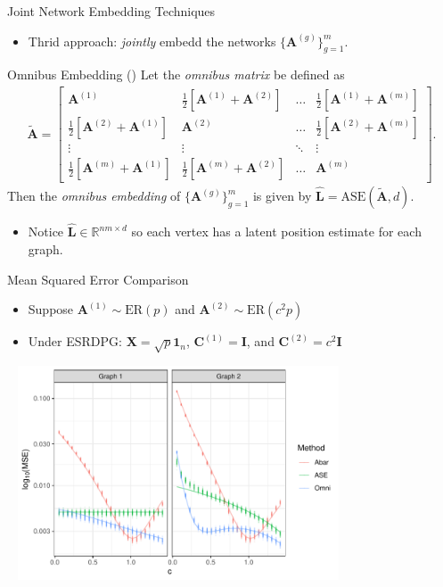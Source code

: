 \documentclass[handout]{beamer}
\newcommand{\bvar}[1]{\mathbf{#1}}
\begin{document}
\begin{frame}{Joint Network Embedding Techniques}
\begin{itemize}
        \item Thrid approach: \textit{jointly} embedd the networks $\{\bvar{A}^{(g)}\}_{g=1}^m$.
\end{itemize}
\begin{block}{Omnibus Embedding (\cite{OmniCLT})}
Let the \textit{omnibus matrix} be defined as
\begin{align*}
    \tilde{\bvar{A}} = \begin{bmatrix}
        \bvar{A}^{(1)} &\frac{1}{2}[\bvar{A}^{(1)} + \bvar{A}^{(2)}] & \dots & \frac{1}{2}[\bvar{A}^{(1)} + \bvar{A}^{(m)}]\\
        \frac{1}{2}[\bvar{A}^{(2)} + \bvar{A}^{(1)}] & \bvar{A}^{(2)} & \dots & \frac{1}{2}[\bvar{A}^{(2)} + \bvar{A}^{(m)}]\\
        \vdots & \vdots & \ddots & \vdots\\
        \frac{1}{2}[\bvar{A}^{(m)} + \bvar{A}^{(1)}] & \frac{1}{2}[\bvar{A}^{(m)} + \bvar{A}^{(2)}] & \dots & \bvar{A}^{(m)}
    \end{bmatrix}.
\end{align*}
Then the \textit{omnibus embedding} of $\{\bvar{A}^{(g)}\}_{g=1}^m$ is given by $\hat{\bvar{L}} = \text{ASE}(\tilde{\bvar{A}}, d)$. 
\end{block}
\begin{itemize}
        \item Notice $\hat{\bvar{L}}\in\mathbb{R}^{nm\times d}$ so each vertex has a latent position estimate for each graph.  
\end{itemize}
\end{frame}


\begin{frame}{Mean Squared Error Comparison}
    \begin{itemize}
        \item Suppose $\bvar{A}^{(1)}\sim\text{ER}(p)$ and $\bvar{A}^{(2)}\sim\text{ER}(c^2p)$
        \item Under ESRDPG: $\bvar{X} = \sqrt{p}\bvar{1}_n$,  $\bvar{C}^{(1)} = \bvar{I}$, and $\bvar{C}^{(2)} = c^2\bvar{I}$
    \end{itemize}\pause
\begin{center}
    \includegraphics[width = 4in, height = 2.5in]{1d_mse.pdf}
\end{center}
\end{frame}
\end{document}
